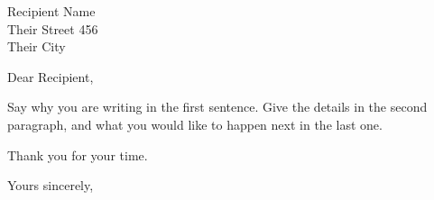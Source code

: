 \documentclass[11pt,a4paper]{letter}
\date{\today}
\begin{document}
\begin{letter}{Recipient Name \\ Their Street 456 \\ Their City}

\opening{Dear Recipient,}

Say why you are writing in the first sentence. Give the details in the
second paragraph, and what you would like to happen next in the last one.

Thank you for your time.

\closing{Yours sincerely,}

\end{letter}
\end{document}
